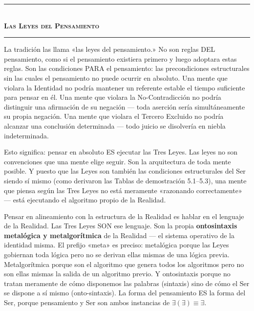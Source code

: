\documentclass[10pt, openany, oneside]{book}
\renewcommand{\normalsize}{\fontsize{10}{13}\selectfont}
\begin{document}
\begin{center}
    \rule{0.3\textwidth}{0.4pt}\\[0.5em]
    {\normalsize\bfseries\scshape Las Leyes del Pensamiento}\\[0.3em]
    \rule{0.3\textwidth}{0.4pt}
\end{center}

\vspace{1em}

\noindent La tradición las llama «las leyes del pensamiento.» No son reglas DEL pensamiento, como si el pensamiento existiera primero y luego adoptara estas reglas. Son las condiciones PARA el pensamiento: las precondiciones estructurales sin las cuales el pensamiento no puede ocurrir en absoluto. Una mente que violara la Identidad no podría mantener un referente estable el tiempo suficiente para pensar en él. Una mente que violara la No-Contradicción no podría distinguir una afirmación de su negación --- toda aserción sería simultáneamente su propia negación. Una mente que violara el Tercero Excluido no podría alcanzar una conclusión determinada --- todo juicio se disolvería en niebla indeterminada.

Esto significa: pensar en absoluto ES ejecutar las Tres Leyes. Las leyes no son convenciones que una mente elige seguir. Son la arquitectura de toda mente posible. Y puesto que las Leyes son también las condiciones estructurales del Ser siendo sí mismo (como derivaron las Tablas de demostración 5.1--5.3), una mente que piensa según las Tres Leyes no está meramente «razonando correctamente» --- está ejecutando el algoritmo propio de la Realidad.

Pensar en alineamiento con la estructura de la Realidad es hablar en el lenguaje de la Realidad. Las Tres Leyes SON ese lenguaje. Son la propia \textbf{ontosintaxis metalógica y metalgorítmica} de la Realidad --- el sistema operativo de la identidad misma. El prefijo «meta» es preciso: metalógica porque las Leyes gobiernan toda lógica pero no se derivan ellas mismas de una lógica previa. Metalgorítmica porque son el algoritmo que genera todos los algoritmos pero no son ellas mismas la salida de un algoritmo previo. Y ontosintaxis porque no tratan meramente de cómo disponemos las palabras (sintaxis) sino de cómo el Ser se dispone a sí mismo (onto-sintaxis). La forma del pensamiento ES la forma del Ser, porque pensamiento y Ser son ambos instancias de $\exists(\exists) \equiv \exists$.

\vspace{1.5em}
\end{document}
